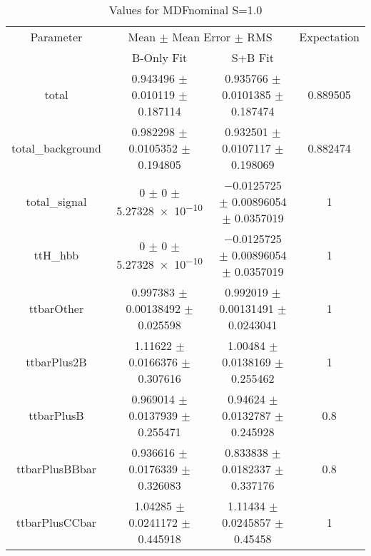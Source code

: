 \begin{table}
\centering
\caption{Values for MDFnominal S=1.0}
\begin{tabular}{cccc}
\toprule
Parameter & \multicolumn{2}{c}{Mean $\pm$ Mean Error $\pm$ RMS} & Expectation\\
 & B-Only Fit & S+B Fit & \\
\midrule
total & \num{0.943496} $\pm$ \num{0.010119} $\pm$ \num{0.187114} & \num{0.935766} $\pm$ \num{0.0101385} $\pm$ \num{0.187474} & \num{0.889505}\\
total\_background & \num{0.982298} $\pm$ \num{0.0105352} $\pm$ \num{0.194805} & \num{0.932501} $\pm$ \num{0.0107117} $\pm$ \num{0.198069} & \num{0.882474}\\
total\_signal & \num{0} $\pm$ \num{0} $\pm$ \num{5.27328e-10} & \num{-0.0125725} $\pm$ \num{0.00896054} $\pm$ \num{0.0357019} & \num{1}\\
ttH\_hbb & \num{0} $\pm$ \num{0} $\pm$ \num{5.27328e-10} & \num{-0.0125725} $\pm$ \num{0.00896054} $\pm$ \num{0.0357019} & \num{1}\\
ttbarOther & \num{0.997383} $\pm$ \num{0.00138492} $\pm$ \num{0.025598} & \num{0.992019} $\pm$ \num{0.00131491} $\pm$ \num{0.0243041} & \num{1}\\
ttbarPlus2B & \num{1.11622} $\pm$ \num{0.0166376} $\pm$ \num{0.307616} & \num{1.00484} $\pm$ \num{0.0138169} $\pm$ \num{0.255462} & \num{1}\\
ttbarPlusB & \num{0.969014} $\pm$ \num{0.0137939} $\pm$ \num{0.255471} & \num{0.94624} $\pm$ \num{0.0132787} $\pm$ \num{0.245928} & \num{0.8}\\
ttbarPlusBBbar & \num{0.936616} $\pm$ \num{0.0176339} $\pm$ \num{0.326083} & \num{0.833838} $\pm$ \num{0.0182337} $\pm$ \num{0.337176} & \num{0.8}\\
ttbarPlusCCbar & \num{1.04285} $\pm$ \num{0.0241172} $\pm$ \num{0.445918} & \num{1.11434} $\pm$ \num{0.0245857} $\pm$ \num{0.45458} & \num{1}\\
\bottomrule
\end{tabular}
\end{table}
